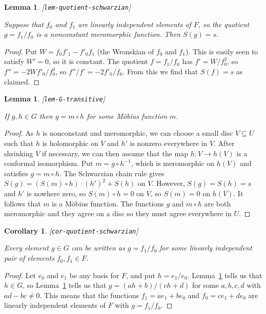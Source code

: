 \documentclass[reqno]{amsart}
\newcommand{\lbl}[1]{\label{#1}\textup{[\texttt{#1}]}\par}
\newcommand{\lbl}{\label}
\newcommand{\sse}       {\subseteq}
\renewcommand{\:}{\colon}
\newtheorem{lemma}[theorem]{Lemma}
\newtheorem{corollary}[theorem]{Corollary}
\theoremstyle{definition}
\begin{document}
\begin{lemma}\lbl{lem-quotient-schwarzian}
 Suppose that $f_0$ and $f_1$ are linearly independent elements of
 $F$, so the quotient $g=f_1/f_0$ is a nonconstant meromorphic
 function.  Then $S(g)=s$.
\end{lemma}
\begin{proof}
 Put $W=f_0f'_1-f'_0f_1$ (the Wronskian of $f_0$ and $f_1$).  This is
 easily seen to satisfy $W'=0$, so it is constant.  The quotient
 $f=f_1/f_0$ has $f'=W/f_0^2$, so $f''=-2Wf'_0/f_0^3$, so
 $f''/f'=-2f'_0/f_0$.  From this we find that $S(f)=s$ as claimed.
\end{proof}

\begin{lemma}\lbl{lem-G-transitive}
 If $g,h\in G$ then $g=m\circ h$ for some M\"obius function $m$.
\end{lemma}
\begin{proof}
 As $h$ is nonconstant and meromorphic, we can choose a small disc
 $V\sse U$ such that $h$ is holomorphic on $V$ and $h'$ is nonzero
 everywhere in $V$.  After shrinking $V$ if necessary, we can then
 assume that the map $h\:V\to h(V)$ is a conformal isomorphism.  Put
 $m=g\circ h^{-1}$, which is meromorphic on $h(V)$ and satisfies
 $g=m\circ h$.  The Schwarzian chain rule gives
 $S(g)=(S(m)\circ h)\cdot(h')^2+S(h)$ on $V$.  However, $S(g)=S(h)=s$
 and $h'$ is nowhere zero, so $S(m)\circ h=0$ on $V$, so $S(m)=0$ on
 $h(V)$.  It follows that $m$ is a M\"obius function.  The functions
 $g$ and $m\circ h$ are both meromorphic and they agree on a disc so
 they must agree everywhere in $U$.
\end{proof}

\begin{corollary}\lbl{cor-quotient-schwarzian}
 Every element $g\in G$ can be written as $g=f_1/f_0$ for some
 linearly independent pair of elements $f_0,f_1\in F$.
\end{corollary}
\begin{proof}
 Let $e_0$ and $e_1$ be any basis for $F$, and put $h=e_1/e_0$.
 Lemma~\ref{lem-quotient-schwarzian} tells us that $h\in G$, so
 Lemma~\ref{lem-G-transitive} tells us that $g=(ah+b)/(ch+d)$ for some
 $a,b,c,d$ with $ad-bc\neq 0$.  This means that the functions
 $f_1=ae_1+be_0$ and $f_0=ce_1+de_0$ are linearly independent elements
 of $F$ with $g=f_1/f_0$.
\end{proof}
\end{document}

